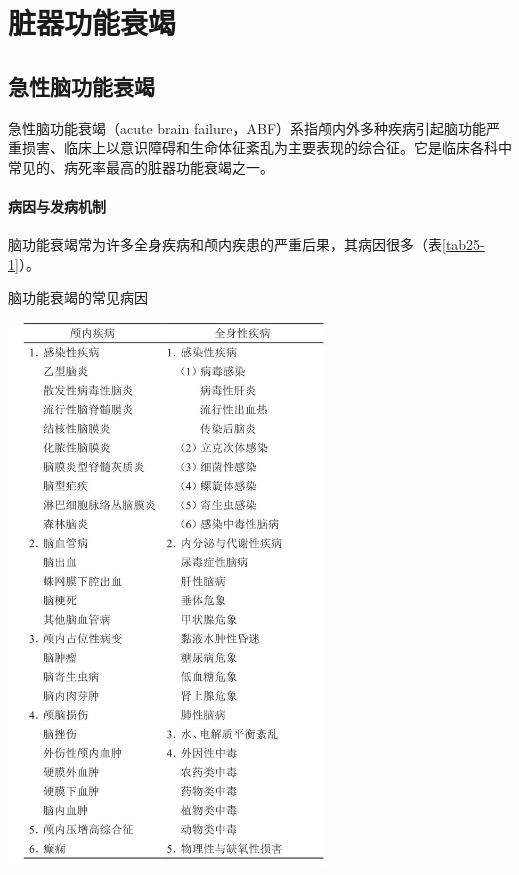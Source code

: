 \part{脏器功能衰竭}

\chapter{急性脑功能衰竭}

急性脑功能衰竭（acute brain
failure，ABF）系指颅内外多种疾病引起脑功能严重损害、临床上以意识障碍和生命体征紊乱为主要表现的综合征。它是临床各科中常见的、病死率最高的脏器功能衰竭之一。

\subsection{病因与发病机制}

脑功能衰竭常为许多全身疾病和颅内疾患的严重后果，其病因很多（表\ref{tab25-1}）。

\begin{table}[htbp]
\centering
\caption{脑功能衰竭的常见病因}
\label{tab25-1}
\includegraphics[width=3.3125in,height=5.67708in]{./images/Image00091.jpg}
\end{table}

